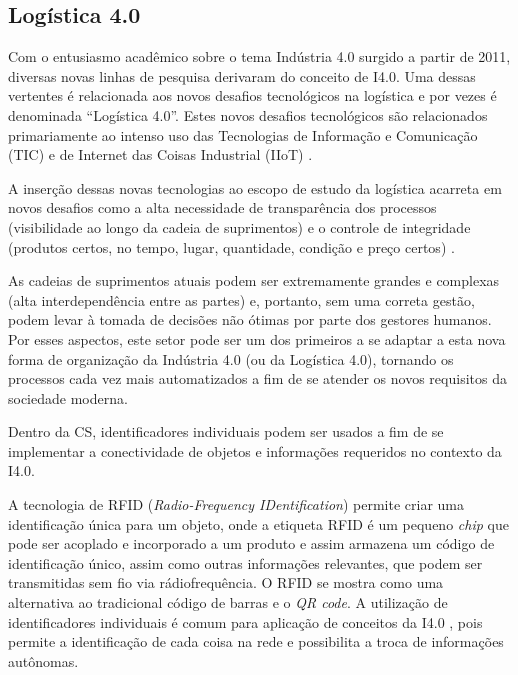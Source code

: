	\subsection{Logística 4.0}
	
	Com o entusiasmo acadêmico sobre o tema Indústria 4.0 surgido a partir de 2011, diversas novas linhas de pesquisa derivaram do conceito de I4.0. Uma dessas vertentes é relacionada aos novos desafios tecnológicos na logística e por vezes é denominada ``Logística 4.0''. Estes novos desafios tecnológicos são relacionados primariamente ao intenso uso das Tecnologias de Informação e Comunicação (TIC) e de Internet das Coisas Industrial (IIoT) \cite{barreto2017industry}.
	
	A inserção dessas novas tecnologias ao escopo de estudo da logística acarreta em novos desafios como a alta necessidade de transparência dos processos (visibilidade ao longo da cadeia de suprimentos) e o controle de integridade (produtos certos, no tempo, lugar, quantidade, condição e preço certos) \cite{barreto2017industry}.

	As cadeias de suprimentos atuais podem ser extremamente grandes e complexas (alta interdependência entre as partes) e, portanto, sem uma correta gestão, podem levar à tomada de decisões não ótimas por parte dos gestores humanos. Por esses aspectos, este setor pode ser um dos primeiros a se adaptar a esta nova forma de organização da Indústria 4.0 (ou da Logística 4.0), tornando os processos cada vez mais automatizados a fim de se atender os novos requisitos da sociedade moderna.

	Dentro da CS, identificadores individuais podem ser usados a fim de se implementar a conectividade de objetos e informações requeridos no contexto da I4.0. 
	
	A tecnologia de RFID (\textit{Radio-Frequency IDentification}) permite criar uma identificação única para um objeto, onde a etiqueta RFID é um pequeno \textit{chip} que pode ser acoplado e incorporado a um produto e assim armazena um código de identificação único, assim como outras informações relevantes, que podem ser transmitidas sem fio via rádiofrequência. O RFID se mostra como uma alternativa ao tradicional código de barras e o \textit{QR code}. A utilização de identificadores individuais é comum para aplicação de conceitos da I4.0 \cite{alyahya2016rfidwarehousing, vlachos2014rfidimpact, fan2015inventory, bibi2017rfidfood}, pois permite a identificação de cada coisa na rede e possibilita a troca de informações autônomas.
	
